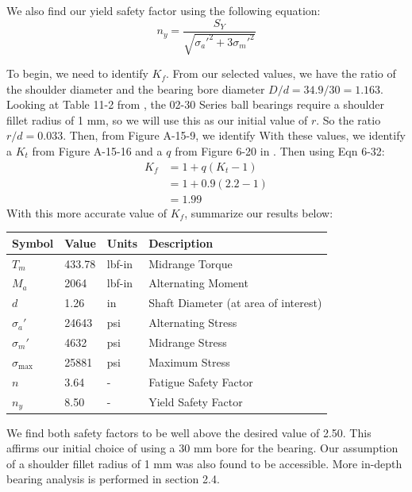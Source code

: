 \documentclass[letterpaper,12pt]{article}
\begin{document}
We also find our yield safety factor using the following equation:
\begin{equation}
    n_y = \frac{S_Y}{\sqrt{\sigma_a'^2 + 3\sigma_m'^2}}
\end{equation}

To begin, we need to identify $K_f$. From our selected values, we have the ratio of the shoulder diameter and the bearing bore diameter $D/d = 34.9/30 = 1.163$. Looking at Table 11-2 from \cite{shigley}, the 02-30 Series ball bearings require a shoulder fillet radius of 1 mm, so we will use this as our initial value of $r$. So the ratio $r/d = 0.033$. Then, from Figure A-15-9, we identify With these values, we identify a $K_t$ from Figure A-15-16 and a $q$ from Figure 6-20 in \cite{shigley}. Then using Eqn 6-32:
\begin{align*}
    K_f &= 1 + q(K_t - 1)\\
    &= 1 + 0.9(2.2 - 1)\\
    &= 1.99
\end{align*}
With this more accurate value of $K_f$, summarize our results below:

\begin{center}
	\begin{tabular}{ |p{1.5cm}||p{1.2cm}|p{2cm}|p{7cm}|  }
		\hline
		Symbol & Value & Units & Description\\
		\hline
		$T_m$ & 433.78 & lbf-in & Midrange Torque\\
        $M_a$ & 2064 & lbf-in  & Alternating Moment\\			
		$d$ & 1.26 & in  & Shaft Diameter (at area of interest)\\
		\hline
		\hline
		$\sigma_a'$ & 24643 & psi & Alternating Stress\\
		$\sigma_m'$ & 4632 & psi & Midrange Stress\\
		$\sigma_{\text{max}}$ & 25881 & psi & Maximum Stress\\
		\hline
		\hline
		$n$ & 3.64 & - & Fatigue Safety Factor\\
		$n_y$ & 8.50 & - & Yield Safety Factor\\
		\hline
	\end{tabular}
\end{center}

We find both safety factors to be well above the desired value of 2.50. This affirms our initial choice of using a 30 mm bore for the bearing. Our assumption of a shoulder fillet radius of 1 mm was also found to be accessible. More in-depth bearing analysis is performed in section 2.4.
\end{document}

